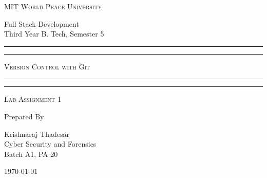 \documentclass[11pt]{article}
\begin{document}
\begin{titlepage}
    \centering


    \huge\textsc{
        MIT World Peace University
    }\\

    \vspace{0.75\baselineskip} %

    \LARGE{
        Full Stack Development\\
        Third Year B. Tech, Semester 5
    }

    \vfill %


    \rule{\textwidth}{1.6pt}\vspace*{-\baselineskip}\vspace*{2pt}
    \rule{\textwidth}{0.6pt}
    \vspace{0.75\baselineskip} %



    \huge{\textsc{
            Version Control with Git
        }} \\



    \vspace{0.5\baselineskip} %
    \rule{\textwidth}{0.6pt}\vspace*{-\baselineskip}\vspace*{2.8pt}
    \rule{\textwidth}{1.6pt}

    \vspace{1\baselineskip} %


    \LARGE\textsc{
        Lab Assignment 1
    } %
    \vfill


    Prepared By
    \vspace{0.5\baselineskip} %

    \Large{
        Krishnaraj Thadesar \\
        Cyber Security and Forensics\\
        Batch A1, PA 20
    }


    \vspace{0.5\baselineskip} %
    \today

\end{titlepage}
\end{document}
